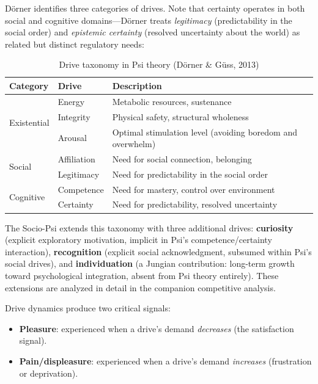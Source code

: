 \documentclass[11pt,letterpaper]{article}
\begin{document}
D\"orner identifies three categories of drives. Note that certainty
operates in both social and cognitive domains---D\"orner treats
\emph{legitimacy} (predictability in the social order) and
\emph{epistemic certainty} (resolved uncertainty about the world) as
related but distinct regulatory needs:

\begin{table}[H]
\centering
\small\sffamily
\caption{Drive taxonomy in Psi theory (D\"orner \& G\"uss, 2013)}
\label{tab:drives}
\begin{tabularx}{\textwidth}{l l X}
\toprule
\textbf{Category} & \textbf{Drive} & \textbf{Description} \\
\midrule
\multirow{3}{*}{Existential}
  & Energy & Metabolic resources, sustenance \\
  & Integrity & Physical safety, structural wholeness \\
  & Arousal & Optimal stimulation level (avoiding boredom and overwhelm) \\
\midrule
\multirow{2}{*}{Social}
  & Affiliation & Need for social connection, belonging \\
  & Legitimacy & Need for predictability in the social order \\
\midrule
\multirow{2}{*}{Cognitive}
  & Competence & Need for mastery, control over environment \\
  & Certainty & Need for predictability, resolved uncertainty \\
\bottomrule
\end{tabularx}
\end{table}

The Socio-Psi extends this taxonomy with three additional drives:
\textbf{curiosity} (explicit exploratory motivation, implicit in Psi's
competence/certainty interaction), \textbf{recognition} (explicit social
acknowledgment, subsumed within Psi's social drives), and
\textbf{individuation} (a Jungian contribution: long-term growth toward
psychological integration, absent from Psi theory entirely). These
extensions are analyzed in detail in the companion competitive analysis.

Drive dynamics produce two critical signals:

\begin{itemize}
  \item \textbf{Pleasure}: experienced when a drive's demand \emph{decreases}
    (the satisfaction signal).
  \item \textbf{Pain/displeasure}: experienced when a drive's demand
    \emph{increases} (frustration or deprivation).
\end{itemize}
\end{document}

